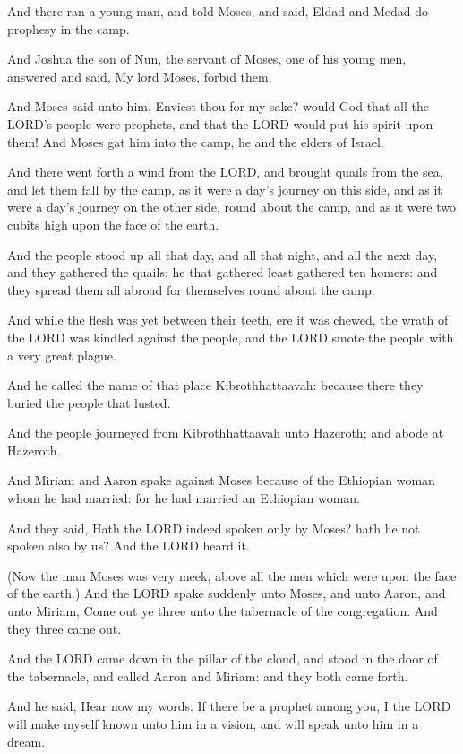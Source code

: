 \Verse And there ran a young man, and told Moses, and said, Eldad and
Medad do prophesy in the camp.

\Verse And Joshua the son of Nun, the servant of Moses, one of his
young men, answered and said, My lord Moses, forbid them.

\Verse And Moses said unto him, Enviest thou for my sake? would God
that all the LORD's people were prophets, and that the LORD would put
his spirit upon them!  \Verse And Moses gat him into the camp, he and
the elders of Israel.

\Verse And there went forth a wind from the LORD, and brought quails
from the sea, and let them fall by the camp, as it were a day's
journey on this side, and as it were a day's journey on the other
side, round about the camp, and as it were two cubits high upon the
face of the earth.

\Verse And the people stood up all that day, and all that night, and
all the next day, and they gathered the quails: he that gathered least
gathered ten homers: and they spread them all abroad for themselves
round about the camp.

\Verse And while the flesh was yet between their teeth, ere it was
chewed, the wrath of the LORD was kindled against the people, and the
LORD smote the people with a very great plague.

\Verse And he called the name of that place Kibrothhattaavah: because
there they buried the people that lusted.

\Verse And the people journeyed from Kibrothhattaavah unto Hazeroth;
and abode at Hazeroth.


\Chapter
\Verse And Miriam and Aaron spake against Moses because of the Ethiopian
woman whom he had married: for he had married an Ethiopian woman.

\Verse And they said, Hath the LORD indeed spoken only by Moses? hath he
not spoken also by us? And the LORD heard it.

\Verse (Now the man Moses was very meek, above all the men which were
upon the face of the earth.)  \Verse And the LORD spake suddenly unto
Moses, and unto Aaron, and unto Miriam, Come out ye three unto the
tabernacle of the congregation. And they three came out.

\Verse And the LORD came down in the pillar of the cloud, and stood in
the door of the tabernacle, and called Aaron and Miriam: and they both
came forth.

\Verse And he said, Hear now my words: If there be a prophet among you,
I the LORD will make myself known unto him in a vision, and will speak
unto him in a dream.

